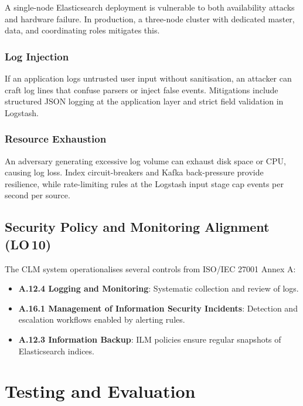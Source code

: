 \documentclass[12pt,a4paper]{report}
\begin{document}
A single-node Elasticsearch deployment is vulnerable to both availability attacks and
hardware failure.
In production, a three-node cluster with dedicated master, data, and coordinating roles
mitigates this.

\subsection{Log Injection}

If an application logs untrusted user input without sanitisation, an attacker can craft
log lines that confuse parsers or inject false events.
Mitigations include structured JSON logging at the application layer and strict field
validation in Logstash.

\subsection{Resource Exhaustion}

An adversary generating excessive log volume can exhaust disk space or CPU, causing log
loss.
Index circuit-breakers and Kafka back-pressure provide resilience, while rate-limiting
rules at the Logstash input stage cap events per second per source.

\section{Security Policy and Monitoring Alignment (LO\,10)}

The CLM system operationalises several controls from ISO/IEC 27001 Annex A:
\begin{itemize}[leftmargin=1.5em]
    \item \textbf{A.12.4 Logging and Monitoring}: Systematic collection and review of logs.
    \item \textbf{A.16.1 Management of Information Security Incidents}: Detection and
          escalation workflows enabled by alerting rules.
    \item \textbf{A.12.3 Information Backup}: ILM policies ensure regular snapshots of
          Elasticsearch indices.
\end{itemize}


\chapter{Testing and Evaluation}
\label{chap:testing}
\end{document}
